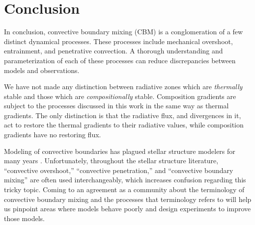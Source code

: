 \section{Conclusion}
\label{sec:conclusions}
In conclusion, convective boundary mixing (CBM) is a conglomeration of a few distinct dynamical processes.
These processes include mechanical overshoot, entrainment, and penetrative convection.
A thorough understanding and parameterization of each of these processes can reduce discrepancies between models and observations.

We have not made any distinction between radiative zones which are \emph{thermally} stable and those which are \emph{compositionally} stable.
Composition gradients are subject to the processes discussed in this work in the same way as thermal gradients.
The only distinction is that the radiative flux, and divergences in it, act to restore the thermal gradients to their radiative values, while composition gradients have no restoring flux.

Modeling of convective boundaries has plagued stellar structure modelers for many years \citep{mesa1, mesa4, mesa5}.
Unfortunately, throughout the stellar structure literature, ``convective overshoot,'' ``convective penetration,'' and ``convective boundary mixing'' are often used interchangeably, which increases confusion regarding this tricky topic.
Coming to an agreement as a community about the terminology of convective boundary mixing and the processes that terminology refers to will help us pinpoint areas where models behave poorly and design experiments to improve those models.



